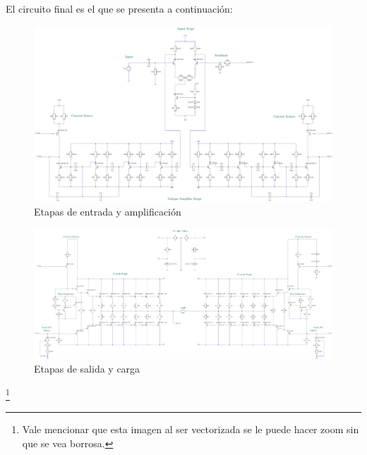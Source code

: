 
El circuito final es el que se presenta a continuación:
 \begin{figure}[H]
\centering
	\includegraphics[width=\textwidth]{ImagenesCaracteristicas/TEX1.pdf}
	\caption{Etapas de entrada y amplificación}
	\label{fig:circ}
\end{figure}
 \begin{figure}[H]
\centering
	\includegraphics[width=\textwidth]{ImagenesCaracteristicas/TEX2.pdf}
	\caption{Etapas de salida y carga}
	\label{fig:circ}
\end{figure}\footnote{Vale mencionar que esta imagen al ser vectorizada se le puede hacer zoom sin que se vea borrosa.}

